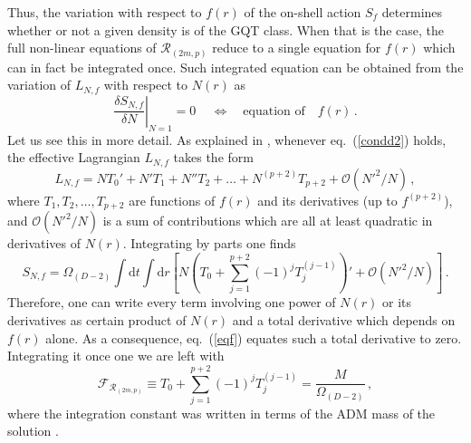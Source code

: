 \documentclass[11pt]{article}
\newcommand{\req}[1]{(\ref{#1})} %
\newcommand{\diff}{\mathrm{d}}
\renewcommand{\req}[1]{eq.~(\ref{#1})}
\begin{document}
{Thus, the variation with respect to $f(r)$ of the on-shell action $S_f$ determines whether or not a given density is of the  GQT class. When that is the case, the full non-linear equations of $\mathcal{R}_{(2m,p)}$ reduce to a single equation for $f(r)$ which can in fact be integrated once. Such integrated equation can be obtained from the variation of $L_{N,f}$ with  respect to $N(r)$ as \begin{equation}\label{eqf}
\left.\frac{\delta S_{N,f}}{\delta N}\right|_{N=1}=0\, \quad \Leftrightarrow   \quad   \text{equation of}\quad f(r)\, .
\end{equation}
Let us see this in more detail. As explained in \cite{PabloPablo3}, whenever \req{condd2} holds, the effective Lagrangian  $L_{N,f}$ takes the form
\begin{equation}\label{fofwo}
L_{N,f}=N T_0' +  N' T_1 +  N'' T_2+ \dots + N^{(p+2)}T_{p+2} +\mathcal{O}(N'^2/N)\, ,
\end{equation}
where $T_{1},T_2,\dots,T_{p+2}$  are functions of $f(r)$ and its derivatives (up to $f^{(p+2)}$), and $\mathcal{O}(N'^2/N)$ is a sum of  contributions  which are all at least quadratic in  derivatives of   $N(r)$. Integrating by parts one finds
\begin{equation}
S_{N,f} = \Omega_{(D-2)}  \int \diff t \int \diff r \left[N\left(T_0 + \sum_{j=1}^{p+2} (-1)^{j} T_{j}^ {(j-1)}\right)' +\mathcal{O}(N'^2/N) \right]\, .
\end{equation}
Therefore, one can write every term involving one power of $N(r)$  or  its derivatives as certain  product of $N(r)$  and a total derivative which depends on $f(r)$ alone. As a consequence, eq.~(\ref{eqf}) equates such a total derivative to zero. Integrating it once one we are left with \cite{PabloPablo3}
\begin{equation} \label{eqqqf}
\mathcal{F}_{\mathcal{R}_{(2m,p)}}  \equiv  T_0 + \sum_{j=1}^{p+2} (-1)^{j} T_{j}^ {(j-1)}=\frac{M}{\Omega_{(D-2)}}\, ,
\end{equation}
where the integration constant was written in terms of the ADM mass of the solution \cite{Arnowitt:1960es,Arnowitt:1960zzc,Arnowitt:1961zz,Deser:2002jk}.

}
\end{document}
